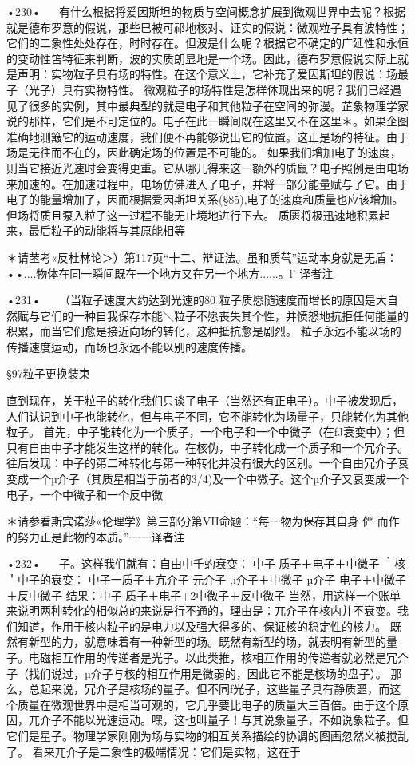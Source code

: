 •230•
  
有什么根据将爱因斯坦的物质与空间概念扩展到微观世界中去呢？根据就是德布罗意的假说，那些巳被可祁地核对、证实的假说：微观粒子具有波特性；它们的二象性处处存在，时时存在。但波是什么呢？根据它不确定的广延性和永恒的变动性笘特征来判断，波的实质朗显地是一个场。因此，德布罗意假说实际上就是声明：实物粒子具有场的特性。在这个意义上，它补充了爱因斯坦的假说：场最子（光子）具有实物特性。
微观粒子的场特性是怎样体现出来的呢？我们已经遇见了很多的实例，其中最典型的就是电子和其他粒子在空间的弥漫。芷象物理学家说的那样，它们是不可定位的。电子在此一瞬间既在这里又不在这里＊。如果企图准确地测簸它的运动速度，我们便不再能够说出它的位置。这正是场的特征。由于场是无往而不在的，因此确定场的位置是不可能的。
如果我们增加电子的速度，则当它接近光速时会变得更重。它从哪儿得来这一额外的质鼠？电子照例是由电场来加速的。在加速过程中，电场仿佛进入了电子，并将一部分能量赋与了它。由于电子的能量增加了，因而根据爱因斯坦关系(§85),电子的速度和质量也应该增加。
但场将质且泵入粒子这一过程不能无止境地进行下去。
质匮将极迅速地积累起来，最后粒子的动能将与其原能相等

＊请苤考«反杜林论＞）第117页“十二、辩证法。虽和质芞”运动本身就是无盾：••....物体在同一瞬间既在一个地方又在另一个地方......。l'-译者注

•231•
  
（当粒子速度大约达到光速的80%
粒子质愿随速度而增长的原因是大自然赋与它们的一种自我保存本能＼粒子不愿丧失其个性，并愤怒地抗拒任何能量的积累，而当它们愈是接近向场的转化，这种抵抗愈是剧烈。
粒子永远不能以场的传播速度运动，而场也永远不能以别的速度传播。

§97粒子更换装束

直到现在，关于粒子的转化我们只谈了电子（当然还有正电子）。中子被发现后，人们认识到中子也能转化，但与电子不同，它不能转化为场量子，只能转化为其他粒子。
首先，中子能转化为一个质子，一个电子和一个中微子（在fJ衰变中）；但只有自由中子才能发生这样的转化。在核伪，中子转化成一个质子和一个冗介子。往后发现：中子的笫二种转化与笫一种转化并没有很大的区别。一个自由冗介子衰变成一个µ介子（其质星相当于前者的3/4)及一个中微子。这个µ介子又衰变成一个电子，一个中微子和一个反中微

＊请参看斯宾诺莎«伦理学》第三部分第VII命题：“每一物为保存其自身
	俨	而作的努力正是此物的本质。”一一译者注

•232•
  
子。这样我们就有：自由中千虳衰变：
中子-质子＋电子＋中微子
｀核＇中子的衰变：
中子一质子＋亢介子
元介子-,i介子＋中微子
µ介子-电子＋中微子＋反中微子
结果：中子-质子＋电子+2中微子＋反中微子
当然，用这样一个账单来说明两种转化的相似总的来说是行不通的，理由是：兀介子在核内并不衰变。我们知道，作用于核内粒子的是电力以及强大得多的、保证核的稳定性的核力。
既然有新型的力，就意味着有一种新型的场。既然有新型的场，就表明有新型的量子。电磁相互作用的传递者是光子。以此类推，核相互作用的传递者就必然是冗介子（找们说过，µ介子与核的相互作用是微弱的，因此它不能是核场的盘子）。
那么，总起来说，冗介子是核场的量子。但不同f光子，这些量子具有静质噩，而这个质量在微观世界中是相当可观的，它几乎要比电子的质量大三百倍。由于这个原因，兀介子不能以光速运动。嘿，这也叫量子！与其说象量子，不如说象粒子。但它们是星子。物理学家刚刚为场与实物的相互关系描绘的协调的图画忽然义被搅乱了。
看来兀介子是二象性的极端情况：它们是实物，这在于

